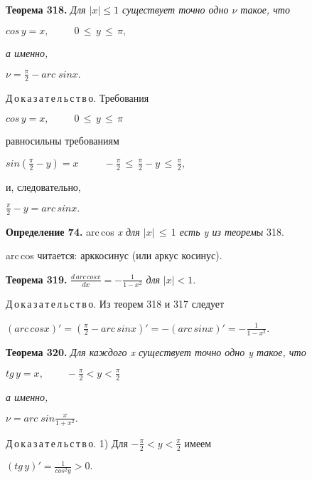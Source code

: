 \documentclass[12pt,a5paper]{book}
\begin{document}
    \textbf{Теорема 318. } \textit{Для $|x| \leqslant 1$ существует точно одно
    $\nu$ такое, что}
    \begin{center}
        $cos\,y=x, \;\;\;\;\;\;\;\;\; 0\,{\leqslant}\,y\,{\leqslant}\,\pi,$
    \end{center}
    \textit{а именно,}
    \begin{center}
        $\displaystyle\nu=\frac{\pi}{2}-arc\;sin{x}.$
    \end{center}
    
    Д\,о\,к\,а\,з\,а\,т\,е\,л\,ь\,с\,т\,в\,о. Требования
    \begin{center}
        $cos\,y=x, \;\;\;\;\;\;\;\;\; 0\,{\leqslant}\,y\,{\leqslant}\,\pi$
    \end{center}
    равносильны требованиям
    \begin{center}
        $\displaystyle sin(\frac{\pi}{2}-y)=x\;\;\;\;\;\;\;\;\; -\frac{\pi}{2}\,{\leqslant}\,\frac{\pi}{2}-y\,{\leqslant}\,\frac{\pi}{2},$
    \end{center}
    и, следовательно,
    \begin{center}
        $\displaystyle\frac{\pi}{2}-y=arc\,sinx.$
    \end{center}

    \textbf{Определение 74.} arc\,cos \textit{x для $|x|\,{\leqslant}\,1$ есть y из теоремы }318.
    
    arc\,cos читается: арккосинус (или аркус косинус).
    
    \textbf{Теорема 319. }$\displaystyle\frac{d\,arc\,cosx}{dx}=-\frac{1}{1-x^2}$ \textit{для} $|x|<1$.
   
    Д\,о\,к\,а\,з\,а\,т\,е\,л\,ь\,с\,т\,в\,о. Из теорем 318 и 317 следует
    \begin{center}
        $(arc\,cosx)'=(\displaystyle\frac{\pi}{2}-arc\,sinx)'=-(arc\,sinx)'=-\frac{1}{1-x^2}$.
    \end{center}
    
    \textbf{Теорема 320. }\textit{Для каждого x существует точно одно y такое, что}
    \begin{center}
        $\displaystyle tg\,y=x, \;\;\;\;\;\;\;\; -\frac{\pi}{2}<y<\frac{\pi}{2}$
    \end{center}
    \textit{а именно,}
    \begin{center}
        $\displaystyle\nu=arc\;sin{\frac{x}{1+x^2}}.$
    \end{center}
    
    Д\,о\,к\,а\,з\,а\,т\,е\,л\,ь\,с\,т\,в\,о. 1) Для $-\displaystyle\frac{\pi}{2}<y<\frac{\pi}{2}$ имеем
    \begin{center}
        $(tg\,y)'=\displaystyle\frac{1}{cos^2y}>0.$
    \end{center}
\end{document}
